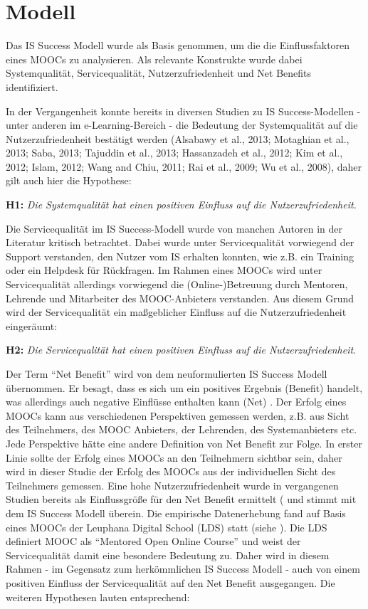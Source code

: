 \section{Modell}
\label{sec:modell}
Das IS Success Modell wurde als Basis genommen, um die die Einflussfaktoren eines MOOCs zu analysieren. Als relevante Konstrukte wurde dabei Systemqualität, Servicequalität, Nutzerzufriedenheit und Net Benefits identifiziert.  

In der Vergangenheit konnte bereits in diversen Studien zu IS Success-Modellen - unter anderen im e-Learning-Bereich - die Bedeutung der Systemqualität auf die Nutzerzufriedenheit bestätigt werden (Alsabawy et al., 2013; Motaghian et al., 2013; Saba, 2013; Tajuddin et al., 2013; Hassanzadeh et al., 2012; Kim et al., 2012; Islam, 2012; Wang and Chiu, 2011; Rai et al., 2009; Wu et al., 2008), daher gilt auch hier die Hypothese: \medskip

\textbf{H1:} \textit{Die Systemqualität hat einen positiven Einfluss auf die Nutzerzufriedenheit.} \medskip

Die Servicequalität im IS Success-Modell wurde von manchen Autoren in der Literatur kritisch betrachtet. Dabei wurde unter Servicequalität vorwiegend der Support verstanden, den Nutzer vom IS erhalten konnten, wie z.B. ein Training oder ein Helpdesk für Rückfragen. Im Rahmen eines MOOCs wird unter Servicequalität allerdings vorwiegend die (Online-)Betreuung durch Mentoren, Lehrende und Mitarbeiter des MOOC-Anbieters verstanden. Aus diesem Grund wird der Servicequalität ein maßgeblicher Einfluss auf die Nutzerzufriedenheit eingeräumt: \medskip

\textbf{H2:} \textit{Die Servicequalität hat einen positiven Einfluss auf die Nutzerzufriedenheit.}\medskip

Der Term "`Net Benefit"' wird von dem neuformulierten IS Success Modell übernommen. Er besagt, dass es sich um ein positives Ergebnis (Benefit) handelt, was allerdings auch negative Einflüsse enthalten kann (Net) \parencite[vgl.][S.2974]{delone2002information}. Der Erfolg eines MOOCs kann aus verschiedenen Perspektiven gemessen werden, z.B. aus Sicht des Teilnehmers, des MOOC Anbieters, der Lehrenden, des Systemanbieters etc. Jede Perspektive hätte eine andere Definition von Net Benefit zur Folge. In erster Linie sollte der Erfolg eines MOOCs an den Teilnehmern sichtbar sein, daher wird in dieser Studie der Erfolg des MOOCs aus der individuellen Sicht des Teilnehmers gemessen. Eine hohe Nutzerzufriedenheit wurde in vergangenen Studien bereits als Einflussgröße für den Net Benefit ermittelt ( und stimmt mit dem IS Success Modell überein. Die empirische Datenerhebung fand auf Basis eines MOOCs der Leuphana Digital School (LDS) statt (siehe ). Die LDS definiert MOOC als "`Mentored Open Online Course"' und weist der Servicequalität damit eine besondere Bedeutung zu. Daher wird in diesem Rahmen - im Gegensatz zum herkömmlichen IS Success Modell - auch von einem positiven Einfluss der Servicequalität auf den Net Benefit ausgegangen. Die weiteren Hypothesen lauten entsprechend: \medskip


